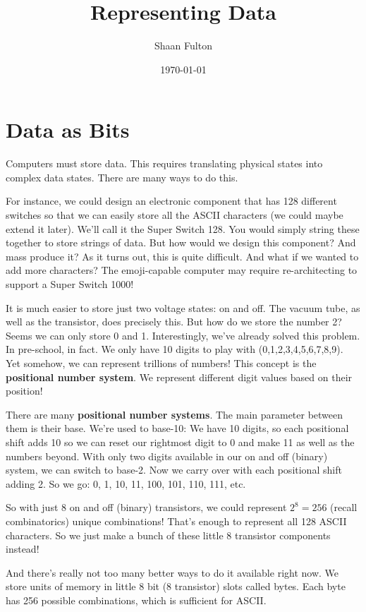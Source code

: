 \documentclass[12pt]{article}
\title{Representing Data}
\author{Shaan Fulton}
\date{\today}
\begin{document}
\maketitle

\section*{Data as Bits}

Computers must store data. This requires translating physical states into complex data states. There are many ways to do this.

For instance, we could design an electronic component that has 128 different switches so that we can easily store all the ASCII characters (we could maybe extend it later). We'll call it the Super Switch 128. You would simply string these together to store strings of data. But how would we design this component? And mass produce it? As it turns out, this is quite difficult. And what if we wanted to add more characters? The emoji-capable computer may require re-architecting to support a Super Switch 1000!

It is  much easier to store just two voltage states: on and off. The vacuum tube, as well as the transistor, does precisely this. But how do we store the number 2? Seems we can only store 0 and 1. Interestingly, we've already solved this problem. In pre-school, in fact. We only have 10 digits to play with (0,1,2,3,4,5,6,7,8,9). Yet somehow, we can represent trillions of numbers! This concept is the \textbf{positional number system}. We represent different digit values based on their position!

There are many \textbf{positional number systems}. The main parameter between them is their base. We're used to base-10: We have 10 digits, so each positional shift adds 10 so we can reset our rightmost digit to 0 and make 11 as well as the numbers beyond. With only two digits available in our on and off (binary) system, we can switch to base-2. Now we carry over with each positional shift adding 2. So we go: 0, 1, 10, 11, 100, 101, 110, 111, etc.

So with just 8 on and off (binary) transistors, we could represent $2^8 = 256$ (recall combinatorics) unique combinations! That's enough to represent all 128 ASCII characters. So we just make a bunch of these little 8 transistor components instead!

And there's really not too many better ways to do it available right now. We store units of memory in little 8 bit (8 transistor) slots called bytes. Each byte has 256 possible combinations, which is sufficient for ASCII.
\end{document}
